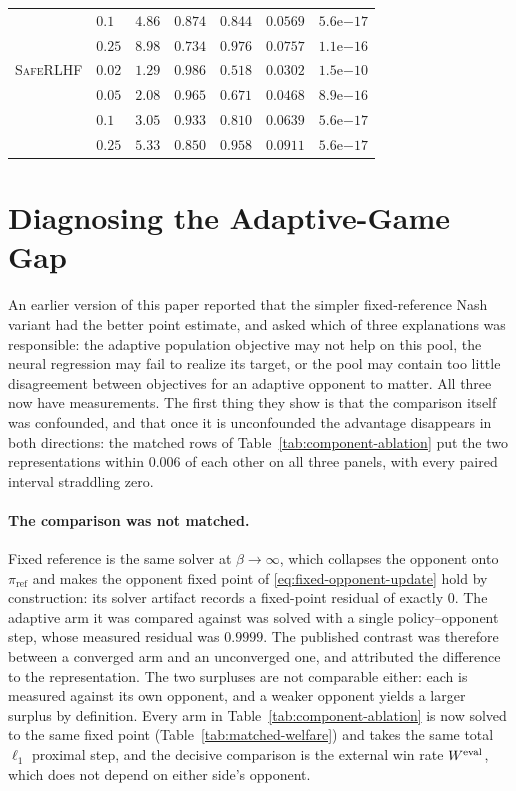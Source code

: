 \documentclass{article}
\theoremstyle{remark}
\theoremstyle{plain}
\newcommand{\piref}{\pi_{\mathrm{ref}}}
\begin{document}
\begin{table}[t]
\begin{tabular}{llrrrrr}
 & $0.1$ & $4.86$ & $0.874$ & $0.844$ & $0.0569$ & $5.6\mathrm{e}{-17}$\\
 & $0.25$ & $8.98$ & $0.734$ & $0.976$ & $0.0757$ & $1.1\mathrm{e}{-16}$\\
\midrule
\textsc{SafeRLHF} & $0.02$ & $1.29$ & $0.986$ & $0.518$ & $0.0302$ & $1.5\mathrm{e}{-10}$\\
 & $0.05$ & $2.08$ & $0.965$ & $0.671$ & $0.0468$ & $8.9\mathrm{e}{-16}$\\
 & $\mathbf{0.1}$ & $3.05$ & $\mathbf{0.933}$ & $0.810$ & $0.0639$ & $5.6\mathrm{e}{-17}$\\
 & $0.25$ & $5.33$ & $0.850$ & $0.958$ & $0.0911$ & $5.6\mathrm{e}{-17}$\\
\bottomrule
\end{tabular}
\end{table}




\section{Diagnosing the Adaptive-Game Gap}
\label{app:representation-diagnostics}
An earlier version of this paper reported that the simpler fixed-reference Nash variant had the
better point estimate, and asked which of three explanations was responsible: the adaptive
population objective may not help on this pool, the neural regression may fail to realize its
target, or the pool may contain too little disagreement between objectives for an adaptive opponent
to matter. All three now have measurements. The first thing they show is that the comparison itself
was confounded, and that once it is unconfounded the advantage disappears in both directions: the
matched rows of Table~\ref{tab:component-ablation} put the two representations within $0.006$ of
each other on all three panels, with every paired interval straddling zero.

\paragraph{The comparison was not matched.} Fixed reference is the same solver at
$\beta\to\infty$, which collapses the opponent onto $\piref$ and makes the opponent fixed point
of \eqref{eq:fixed-opponent-update} hold by construction: its solver artifact records a fixed-point
residual of exactly $0$. The adaptive arm it was compared against was solved with a single
policy--opponent step, whose measured residual was $0.9999$. The published contrast was therefore
between a converged arm and an unconverged one, and attributed the difference to the representation.
The two surpluses are not comparable either: each is measured against its own opponent, and a
weaker opponent yields a larger surplus by definition. Every arm in
Table~\ref{tab:component-ablation} is now solved to the same fixed point
(Table~\ref{tab:matched-welfare}) and takes the same total $\ell_1$ proximal step, and the decisive
comparison is the external win rate $W^{\rm eval}$, which does not depend on either side's
opponent.
\end{document}
